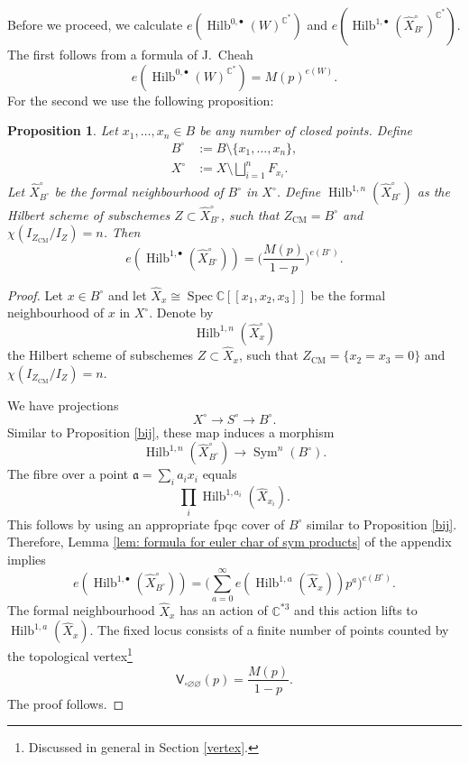 \documentclass{amsart}
\newtheorem{proposition}[theorem]{Proposition}
\theoremstyle{definition}
\newcommand{\CC} {\mathbb{C}}          %
\newcommand{\sfV}{\mathsf{V}}
\newcommand{\Sym}{\operatorname{Sym}}
\newcommand{\Hilb}{\operatorname{Hilb}}
\newcommand{\CM}{\operatorname{CM}}
\newcommand{\Spec}{\operatorname{Spec}}
\begin{document}
Before we proceed, we calculate $e(\Hilb^{0,\bullet}(W)^{\CC^*})$ and $e(\Hilb^{1,\bullet}(\widehat{X}^{\circ}_{B^{\circ}})^{\CC^*})$. The first follows from a formula of J.~Cheah \cite{Che} 
\begin{equation} \label{Cheah}
e(\Hilb^{0,\bullet}(W)^{\CC^*}) = M(p)^{e(W)}.
\end{equation}
For the second we use the following proposition:
\begin{proposition} \label{section}
Let $x_1, \ldots, x_n \in B$ be any number of closed points. Define 
\begin{align*}
B^\circ &:= B \setminus \{x_1, \ldots, x_n\}, \\
X^\circ &:= X \setminus \bigsqcup_{i=1}^{n} F_{x_i}.
\end{align*} 
Let $\widehat{X}^{\circ}_{B^{\circ}}$ be the formal neighbourhood of $B^\circ$ in $X^\circ$. Define $\Hilb^{1,n}(\widehat{X}^{\circ}_{B^{\circ}})$ as the Hilbert scheme of subschemes $Z \subset \widehat{X}^{\circ}_{B^{\circ}}$, such that $Z_{\CM} = B^\circ$ and $\chi(I_{Z_{\CM}} / I_Z) = n$.
Then
$$
e(\Hilb^{1,\bullet}(\widehat{X}^{\circ}_{B^{\circ}})) = \Bigg( \frac{M(p)}{1-p} \Bigg)^{e(B^\circ)}.
$$
\end{proposition}
\begin{proof}
Let $x \in B^\circ$ and let $\widehat{X}_{x} \cong \Spec \CC [\![x_1,x_2,x_3]\!]$ be the formal neighbourhood of $x$ in $X^\circ$. Denote by $$\Hilb^{1,n}(\widehat{X}^{\circ}_{x})$$ the Hilbert scheme of subschemes $Z \subset \widehat{X}_{x}$, such that $Z_{\CM} = \{x_2=x_3=0\}$ and $\chi(I_{Z_{\CM}} / I_Z) = n$. 

We have projections
$$
X^\circ \longrightarrow S^\circ \longrightarrow B^\circ.
$$
Similar to Proposition \ref{bij}, these map induces a morphism
$$
\Hilb^{1,n}(\widehat{X}^{\circ}_{B^{\circ}}) \longrightarrow \Sym^n(B^\circ).
$$
The fibre over a point $\mathfrak{a} = \sum_i a_i x_i$ equals
$$
\prod_{i} \Hilb^{1,a_i}(\widehat{X}_{x_i}).
$$
This follows by using an appropriate fpqc cover of $B^\circ$ similar to Proposition \ref{bij}. Therefore, Lemma \ref{lem: formula for euler char of sym products} of the appendix implies
$$
e(\Hilb^{1,\bullet}(\widehat{X}^{\circ}_{B^{\circ}})) = \Bigg( \sum_{a=0}^{\infty} e(\Hilb^{1,a}(\widehat{X}_{x})) p^a \Bigg)^{e(B^\circ)}.
$$
The formal neighbourhood $\widehat{X}_{x}$ has an action of $\CC^{*3}$ and this action lifts to $\Hilb^{1,a}(\widehat{X}_{x})$. The fixed locus consists of a finite number of points counted by the topological vertex\footnote{Discussed in general in Section \ref{vertex}.}
$$
\sfV_{\square\varnothing\varnothing}(p) = \frac{M(p)}{1-p}.
$$
The proof follows.
\end{proof}
\end{document}
